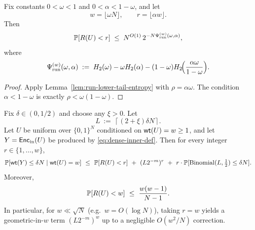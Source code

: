\begin{corollary}
\label{cor:run-lower-tail-alpha}
Fix constants \(0<\omega<1\) and \(0<\alpha<1-\omega\), and let
\[
w=\lfloor \omega N\rfloor,
\qquad
r=\lfloor \alpha w\rfloor.
\]
Then
\begin{equation}
\label{eq:run-lower-tail-alpha}
\mathbb{P}[R(U)<r]
\;\le\;
N^{O(1)}\,2^{-N\Psi_{\mathrm{run}}^{(w)}(\omega,\alpha)},
\end{equation}
where
\begin{equation}
\label{eq:run-rate-function-alpha}
\Psi_{\mathrm{run}}^{(w)}(\omega,\alpha)
\;:=\;
H_2(\omega)
- \omega H_2(\alpha)
- (1-\omega)H_2\!\Bigl(\frac{\alpha\omega}{1-\omega}\Bigr).
\end{equation}
\end{corollary}

\begin{proof}
Apply Lemma~\ref{lem:run-lower-tail-entropy} with \(\rho=\alpha\omega\).
The condition \(\alpha<1-\omega\) is exactly \(\rho<\omega(1-\omega)\).
\end{proof}

\begin{lemma}
\label{lem:dense-forced-termination}
Fix $\delta\in(0,1/2)$ and choose any $\xi>0$. Let
\[
L\ :=\ \left\lceil (2+\xi)\delta N \right\rceil.
\]
Let $U$ be uniform over $\{0,1\}^N$ conditioned on $\mathsf{wt}(U)=w\ge 1$, and let $Y=\mathsf{Enc}_{\mathrm{in}}(U)$ be produced by
\eqref{eq:dense-inner-def}. Then for every integer $r\in\{1,\dots,w\}$,
\begin{equation}
\label{eq:dense-forced-termination}
\mathbb{P}[\mathsf{wt}(Y)\le \delta N \mid \mathsf{wt}(U)=w]
\ \le\
\mathbb{P}[R(U)<r]\ +\ (L2^{-m})^{r}\ +\ r\cdot \mathbb{P}[\mathrm{Binomial}(L,\tfrac12)\le \delta N].
\end{equation}
Moreover,
\begin{equation}
\label{eq:runs-adjacent-bound}
\mathbb{P}[R(U)<w]\ \le\ \frac{w(w-1)}{N-1}.
\end{equation}
In particular, for $w\ll \sqrt{N}$ (e.g.\ $w=O(\log N)$), taking $r=w$ yields a geometric-in-$w$ term
$(L2^{-m})^w$ up to a negligible $O(w^2/N)$ correction.
\end{lemma}

